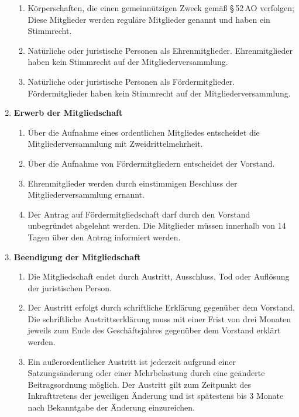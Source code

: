 \documentclass[german]{article}
\newcommand{\paragr}[1]{\item \textsf{\textbf{#1}}}
\begin{document}
\begin{enumerate}
\begin{enumerate}
			\item Körperschaften, die einen gemeinnützigen Zweck gemäß §\,52\,AO verfolgen; Diese Mitglieder werden reguläre Mitglieder genannt und haben ein Stimmrecht. \label{mitglieder_regulaer}
			
			\item Natürliche oder juristische Personen als Ehrenmitglieder. Ehrenmitglieder haben kein Stimmrecht auf der Mitgliederversammlung.
			
			\item Natürliche oder juristische Personen als Fördermitglieder. Fördermitglieder haben kein Stimmrecht auf der Mitgliederversammlung.
		\end{enumerate}
		
		
		\paragr{Erwerb der Mitgliedschaft}
		\begin{enumerate}
			
			\item Über die Aufnahme eines ordentlichen Mitgliedes entscheidet die Mitgliederversammlung mit Zweidrittelmehrheit.
			
			\item Über die Aufnahme von Fördermitgliedern entscheidet der Vorstand.
			
			\item Ehrenmitglieder werden durch einstimmigen Beschluss der Mitgliederversammlung ernannt.
			
			\item Der Antrag auf Fördermitgliedschaft darf durch den Vorstand unbegründet abgelehnt werden.
			Die Mitglieder müssen innerhalb von 14 Tagen über den Antrag informiert werden.
			
		\end{enumerate}
		
		
		\paragr{Beendigung der Mitgliedschaft}
		\begin{enumerate}
			
			\item Die Mitgliedschaft endet durch Austritt, Ausschluss, Tod oder Auflösung der juristischen Person.
			
			\item Der Austritt erfolgt durch schriftliche Erklärung gegenüber dem Vorstand.
			Die schriftliche Austrittserklärung muss mit einer Frist von drei Monaten jeweils zum Ende des Geschäftsjahres gegenüber dem Vorstand erklärt werden.
			
			\item Ein außerordentlicher Austritt ist jederzeit aufgrund einer Satzungsänderung oder einer Mehrbelastung durch eine geänderte Beitragsordnung möglich.
			Der Austritt gilt zum Zeitpunkt des Inkrafttretens der jeweiligen Änderung und ist spätestens bis 3 Monate nach Bekanntgabe der Änderung einzureichen.
			

\end{enumerate}
\end{enumerate}
\end{document}
